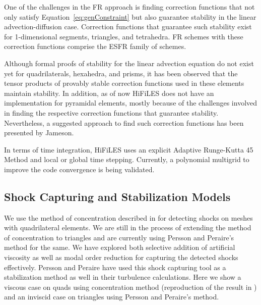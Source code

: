 One of the challenges in the FR approach is finding correction functions that not only satisfy Equation~\eqref{eq:genConstraint} but also guarantee stability in the linear advection-diffusion case. Correction functions that guarantee such stability exist for 1-dimensional segments\cite{vincent2011new}, triangles\cite{castonguay2012new,williams2013tri}, and tetrahedra\cite{williams2013tet}. FR schemes with these correction functions comprise the ESFR family of schemes.

Although formal proofs of stability for the linear advection equation do not exist yet for quadrilaterals, hexahedra, and prisms, it has been observed that the tensor products of provably stable correction functions used in these elements maintain stability. In addition, as of now HiFiLES does not have an implementation for pyramidal elements, mostly because of the challenges involved in finding the respective correction functions that guarantee stability. Nevertheless, a suggested approach to find such correction functions has been presented by Jameson\cite{jameson2011advances}.

In terms of time integration, HiFiLES uses an explicit Adaptive Runge-Kutta 45 Method and local or global time stepping. Currently, a polynomial multigrid to improve the code convergence is being validated.

\subsection{Shock Capturing and Stabilization Models}

We use the method of concentration described in \cite{abhishekshockcapture} for detecting shocks on meshes with quadrilateral elements. We are still in the process of extending the method of concentration to triangles and are currently using Persson and Peraire's method \cite{Persson06} \cite{Persson13} for the same. We have explored both selective addition of artificial viscosity as well as modal order reduction for capturing the detected shocks effectively. Persson and Peraire have used this shock capturing tool as a stabilization method as well in their turbulence calculations. Here we show a viscous case on quads using concentration method (reproduction of the result in \cite{abhishekshockcapture}) and an inviscid case on triangles using Persson and Peraire's method.

